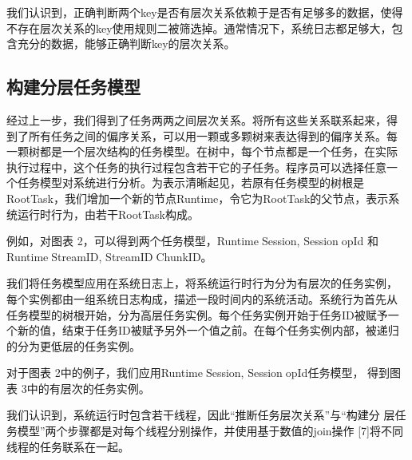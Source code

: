 我们认识到，正确判断两个key是否有层次关系依赖于是否有足够多的数据，使得不存在层次关系的key使用规则二被筛选掉。通常情况下，系统日志都足够大，包含充分的数据，能够正确判断key的层次关系。

\subsection{构建分层任务模型}

经过上一步，我们得到了任务两两之间层次关系。将所有这些关系联系起来，得
到了所有任务之间的偏序关系，可以用一颗或多颗树来表达得到的偏序关系。每
一颗树都是一个层次结构的任务模型。在树中，每个节点都是一个任务，在实际
执行过程中，这个任务的执行过程包含若干它的子任务。程序员可以选择任意一
个任务模型对系统进行分析。为表示清晰起见，若原有任务模型的树根是
RootTask，我们增加一个新的节点Runtime，令它为RootTask的父节点，表示系
统运行时行为，由若干RootTask构成。

例如，对图表 2，可以得到两个任务模型，RuntimeSession, SessionopId
和RuntimeStreamID, StreamIDChunkID。

我们将任务模型应用在系统日志上，将系统运行时行为分为有层次的任务实例，
每个实例都由一组系统日志构成，描述一段时间内的系统活动。系统行为首先从
任务模型的树根开始，分为高层任务实例。每个任务实例开始于任务ID被赋予一
个新的值，结束于任务ID被赋予另外一个值之前。在每个任务实例内部，被递归
的分为更低层的任务实例。

对于图表 2中的例子，我们应用RuntimeSession, SessionopId任务模型，
得到图表 3中的有层次的任务实例。

我们认识到，系统运行时包含若干线程，因此“推断任务层次关系”与“构建分
层任务模型”两个步骤都是对每个线程分别操作，并使用基于数值的join操作
[7]将不同线程的任务联系在一起。

